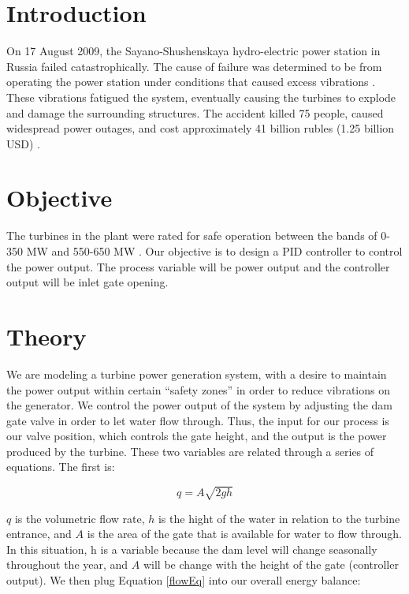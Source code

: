 \documentclass{article}
\begin{document}
    \begin{multicols*}{2}
        \newlength{\mywidth}
        \setlength{\mywidth}{\linewidth}
        \addtolength{\mywidth}{-0.5\columnsep}

        \section{Introduction}

        On 17 August 2009, the Sayano-Shushenskaya hydro-electric power station in Russia failed catastrophically.  The cause of failure was determined to be from operating the power station under conditions that caused excess vibrations \cite{SayanoAccidentUpdate}. These vibrations fatigued the system, eventually causing the turbines to explode and damage the surrounding structures. The accident killed 75 people, caused widespread power outages, and cost approximately 41 billion rubles (1.25 billion USD) \cite{sayanoDam}.
        
        \section{Objective}

        The turbines in the plant were rated for safe operation between the bands of 0-350 MW and 550-650 MW \cite{sayWiki}. Our objective is to design a PID controller to control the power output.  The process variable will be power output and the controller output will be inlet gate opening.

        \section{Theory}

        We are modeling a turbine power generation system, with a desire to maintain the power output within certain “safety zones” in order to reduce vibrations on the generator. We control the power output of the system by adjusting the dam gate valve in order to let water flow through. Thus, the input for our process is our valve position, which controls the gate height, and the output is the power produced by the turbine. These two variables are related through a series of equations. The first is: 

        \begin{equation}\label{flowEq}
            q = A \sqrt{2gh}
        \end{equation}

        $q$ is the volumetric flow rate, $h$ is the hight of the water in relation to the turbine entrance, and $A$ is the area of the gate that is available for water to flow through. In this situation, h is a variable because the dam level will change seasonally throughout the year, and $A$ will be change with the height of the gate (controller output). We then plug Equation \ref{flowEq} into our overall energy balance:


\end{multicols*}
\end{document}
